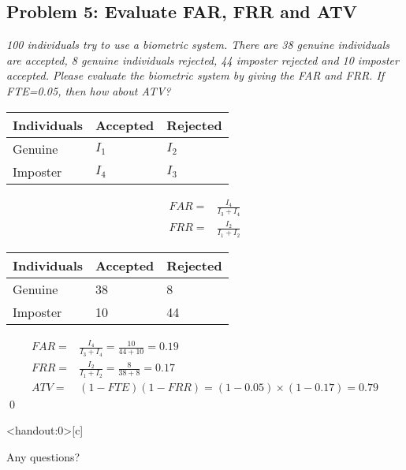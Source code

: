 \documentclass[
        ]{beamer}
\begin{document}
    \subsection{Problem 5: Evaluate FAR, FRR and ATV}
        \begin{frame}[c]{\subsecname}
            \emph{100 individuals try to use a biometric system.  There are 38 genuine individuals are accepted, 8 genuine individuals rejected, 44 imposter rejected and 10 imposter accepted. Please evaluate the biometric system by giving the FAR and FRR. If FTE=0.05, then how about ATV?  }
        \end{frame}       
        
        \begin{frame}[c]{\subsecname}
            \begin{overprint}
            \begin{center}
            \begin{tabular}{lll}
                    \hline%
                    Individuals     & Accepted   & Rejected \\\hline%
                    Genuine         & $I_1$      & $I_2$    \\
                    Imposter        & $I_4$      & $I_3$    \\\hline%
            \end{tabular}
            \end{center}
                \begin{align*}
             FAR=&\frac{I_4}{I_3+I_4}\\
             FRR=&\frac{I_2}{I_1+I_2}
                \end{align*}
            \begin{center}
            \begin{tabular}{lll}
                    \hline%
                    Individuals     & Accepted   & Rejected \\\hline%
                    Genuine         & 38         & 8        \\
                    Imposter        & 10         & 44       \\\hline%
            \end{tabular}
            \end{center}
                \begin{align*}
             FAR=&\frac{I_4}{I_3+I_4}=\frac{10}{44+10}=0.19\\
             FRR=&\frac{I_2}{I_1+I_2}=\frac{8}{38+8}=0.17\\
             ATV=&(1-FTE)(1-FRR)=(1-0.05)\times(1-0.17)=0.79
                \end{align*}\qed
            \end{overprint}   
        \end{frame}

    
    \begin{frame}<handout:0>[c]{\secname}
        \centerline{\Large{Any questions?}}
    \end{frame}
    
    
    
\end{document}
